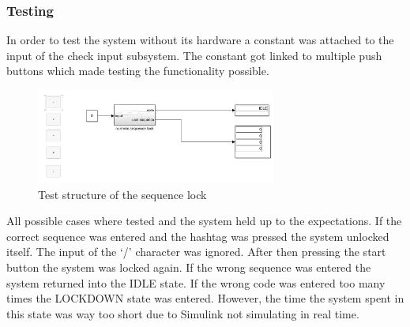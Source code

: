 \subsubsection{Testing}
In order to test the system without its hardware a constant was attached to the input of the check input subsystem. The constant got linked to multiple push buttons which made testing the functionality possible. 
\begin{figure}[H]
		\centering
		\includegraphics[width=0.7\textwidth]{figures/testing_sim.png}
		\caption{Test structure of the sequence lock}
		\label{fig:scheme}
\end{figure}
All possible cases where tested and the system held up to the expectations. If the correct sequence was entered and the hashtag was pressed the system unlocked itself. The input of the ‘/’ character was ignored. After then pressing the start button the system was locked again. If the wrong sequence was entered the system returned into the IDLE state. If the wrong code was entered too many times the LOCKDOWN state was entered. However, the time the system spent in this state was way too short due to Simulink not simulating in real time.

